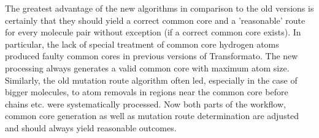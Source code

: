 The greatest advantage of the new algorithms in comparison to the old versions is certainly that they should yield a correct common core and a 'reasonable' route for every molecule pair without exception (if a correct common core exists). In particular, the lack of special treatment of common core hydrogen atoms produced faulty common cores in previous versions of Transformato. The new processing always generates a valid common core with maximum atom size. Similarly, the old mutation route algorithm often led, especially in the case of bigger molecules, to atom removals in regions near the common core before chains etc. were systematically processed. Now both parts of the workflow, common core generation as well as mutation route determination are adjusted and should always yield reasonable outcomes.

